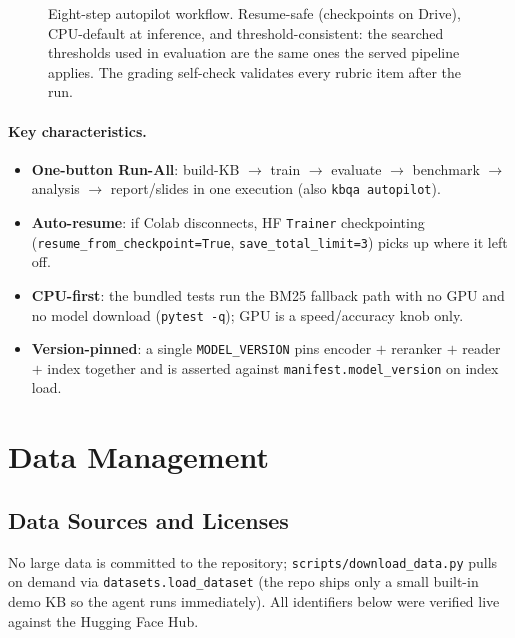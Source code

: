 \documentclass[12pt,a4paper]{article}
\begin{document}
\begin{figure}[H]
{%
}
\caption{Eight-step autopilot workflow. Resume-safe (checkpoints on Drive), CPU-default at inference, and threshold-consistent: the searched thresholds used in evaluation are the same ones the served pipeline applies. The grading self-check validates every rubric item after the run.}
\label{fig:workflow}
\end{figure}

\paragraph{Key characteristics.}
\begin{itemize}\setlength\itemsep{0.15em}
  \item \textbf{One-button Run-All}: build-KB $\rightarrow$ train $\rightarrow$ evaluate $\rightarrow$ benchmark $\rightarrow$ analysis $\rightarrow$ report/slides in one execution (also \texttt{kbqa autopilot}).
  \item \textbf{Auto-resume}: if Colab disconnects, HF \texttt{Trainer} checkpointing (\texttt{resume\_from\_checkpoint=True}, \texttt{save\_total\_limit=3}) picks up where it left off.
  \item \textbf{CPU-first}: the bundled tests run the BM25 fallback path with no GPU and no model download (\texttt{pytest -q}); GPU is a speed/accuracy knob only.
  \item \textbf{Version-pinned}: a single \texttt{MODEL\_VERSION} pins encoder $+$ reranker $+$ reader $+$ index together and is asserted against \texttt{manifest.model\_version} on index load.
\end{itemize}

\section{Data Management}

\subsection{Data Sources and Licenses}

No large data is committed to the repository; \texttt{scripts/download\_data.py} pulls on demand via \texttt{datasets.load\_dataset} (the repo ships only a small built-in demo KB so the agent runs immediately). All identifiers below were verified live against the Hugging Face Hub.
\end{document}
